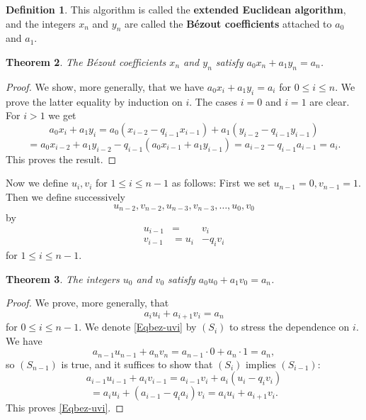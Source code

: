 \documentclass[12pt,letterpaper]{article}
\newtheorem{thm}{Theorem}%
\theoremstyle{definition}
\newtheorem{defn}[thm]{Definition}
\begin{document}
\begin{defn}\label{Dbez}
This algorithm is called the \textbf{extended Euclidean algorithm},  and the integers $x_n$ and $y_n$ are called the \textbf{Bézout coefficients}  attached to $a_0$ and $a_1$. 
\end{defn}

\begin{thm}\label{Tbez-xy}
The Bézout coefficients $x_n$ and $y_n$ satisfy $a_0 x_n + a_1 y_n = a_n$. 
\end{thm}

\begin{proof}
We show, more generally, that we have $a_0x_i+a_1y_i=a_i$ for $0\le i\le n$. We prove the latter equality by induction on $i$. The cases $i=0$ and $i=1$ are clear. For $i>1$ we get 
$$
a_0x_i+a_1y_i=a_0(x_{i-2}-q_{i-1} x_{i-1})+a_1(y_{i-2}-q_{i-1} y_{i-1})
$$ 
$$
=a_0x_{i-2}+a_1y_{i-2}-q_{i-1}(a_0x_{i-1}+a_1y_{i-1})=a_{i-2}-q_{i-1} a_{i-1}=a_i.
$$ 
This proves the result. 
\end{proof}

Now we define $u_i,v_i$ for $1\le i\le n-1$ as follows: First we set $u_{n-1}=0, v_{n-1}=1$. Then we define successively 
$$
u_{n-2}, v_{n-2}, u_{n-3}, v_{n-3}, \ldots, u_0, v_0
$$ 
by 
\begin{equation}\label{Eqsys1}
\begin{aligned}
u_{i-1} &=   & v_i \\
v_{i-1} &= u_i & -q_i v_i 
\end{aligned}
\end{equation}
for $1\le i\le n-1$. 

\begin{thm}\label{Tbez-uv0}
The integers $u_0$ and $v_0$ satisfy $a_0 u_0 + a_1 v_0 = a_n$. 
\end{thm}

\begin{proof}
We prove, more generally, that 
\begin{equation}\label{Eqbez-uvi}
a_i u_i + a_{i+1} v_i = a_n
\end{equation} 
for $0\le i\le n-1$. We denote \eqref{Eqbez-uvi} by $(S_i)$ to stress the dependence on $i$. We have 
$$
a_{n-1} u_{n-1} + a_n v_n = a_{n-1} \cdot 0 + a_n \cdot 1 = a_n,
$$ 
so $(S_{n-1})$ is true, and it suffices to show that $(S_i)$ implies $(S_{i-1})$: 
$$
a_{i-1} u_{i-1} + a_i v_{i-1} = a_{i-1} v_i + a_i (u_i-q_i v_i) 
$$ 
$$
= a_i u_i + (a_{i-1} - q_i a_i) v_i = a_i u_i + a_{i+1} v_i.
$$ 
This proves \eqref{Eqbez-uvi}.
\end{proof}
\end{document}
